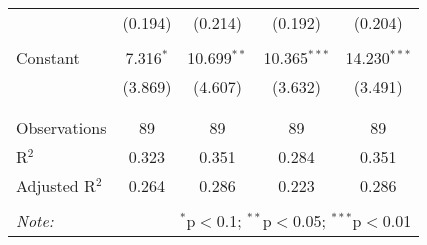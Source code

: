 \begin{tabular}{@{\extracolsep{5pt}}lcccc}
  & (0.194) & (0.214) & (0.192) & (0.204) \\ 
  & & & & \\ 
 Constant & 7.316$^{*}$ & 10.699$^{**}$ & 10.365$^{***}$ & 14.230$^{***}$ \\ 
  & (3.869) & (4.607) & (3.632) & (3.491) \\ 
  & & & & \\ 
\hline \\[-1.8ex] 
Observations & 89 & 89 & 89 & 89 \\ 
R$^{2}$ & 0.323 & 0.351 & 0.284 & 0.351 \\ 
Adjusted R$^{2}$ & 0.264 & 0.286 & 0.223 & 0.286 \\ 
\hline 
\hline \\[-1.8ex] 
\textit{Note:}  & \multicolumn{4}{r}{$^{*}$p$<$0.1; $^{**}$p$<$0.05; $^{***}$p$<$0.01} \\ 
\end{tabular} 
